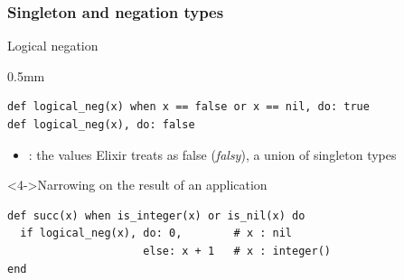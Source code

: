 \begin{frame}[fragile,t]
\frametitle{Singleton and negation types}
\begin{block}{Logical negation}%
\vspace{-9mm}
\begin{overlayarea}{\textwidth}{0.5mm}%
\end{overlayarea}%
\hfill \vspace{1mm}
\begin{verbatim}
def logical_neg(x) when x == false or x == nil, do: true
def logical_neg(x), do: false
\end{verbatim}
\end{block}
\pause
\begin{itemize}
    \item {}: the values Elixir treats as false (\emph{falsy}), a union of singleton types
\end{itemize}
\begin{block}<4->{Narrowing on the result of an application}
\begin{verbatim}
def succ(x) when is_integer(x) or is_nil(x) do
  if logical_neg(x), do: 0,        # x : nil
                     else: x + 1   # x : integer()
end
\end{verbatim}
\vspace{-1mm}
\end{block}

\end{frame}




